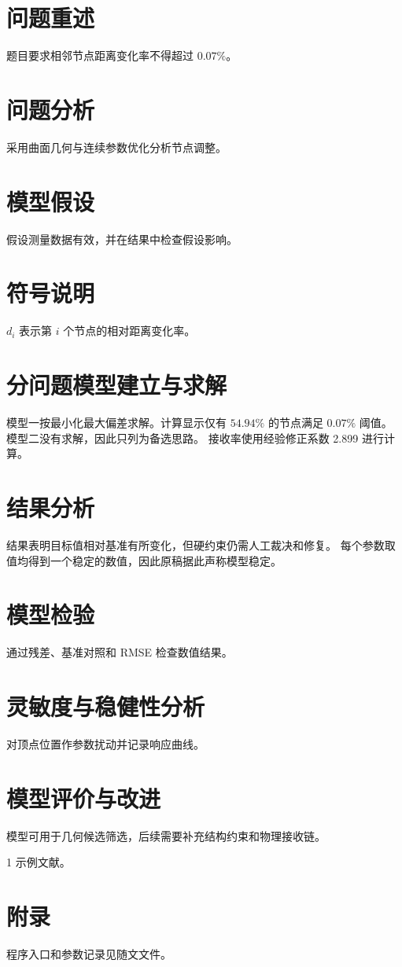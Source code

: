 \documentclass{ctexart}
\begin{document}
\begin{abstract}
本文建立几何模型并报告结果、约束与检验。
\end{abstract}
\section{问题重述}
题目要求相邻节点距离变化率不得超过 $0.07\%$。
\section{问题分析}
采用曲面几何与连续参数优化分析节点调整。
\section{模型假设}
假设测量数据有效，并在结果中检查假设影响。
\section{符号说明}
$d_i$ 表示第 $i$ 个节点的相对距离变化率。
\section{分问题模型建立与求解}
模型一按最小化最大偏差求解。计算显示仅有 $54.94\%$ 的节点满足
$0.07\%$ 阈值。模型二没有求解，因此只列为备选思路。
接收率使用经验修正系数 2.899 进行计算。
\section{结果分析}
结果表明目标值相对基准有所变化，但硬约束仍需人工裁决和修复。
每个参数取值均得到一个稳定的数值，因此原稿据此声称模型稳定。
\section{模型检验}
通过残差、基准对照和 RMSE 检查数值结果。
\section{灵敏度与稳健性分析}
对顶点位置作参数扰动并记录响应曲线。
\section{模型评价与改进}
模型可用于几何候选筛选，后续需要补充结构约束和物理接收链。
\begin{thebibliography}{1}
 示例文献。
\end{thebibliography}
\appendix
\section{附录}
程序入口和参数记录见随文文件。
\end{document}
